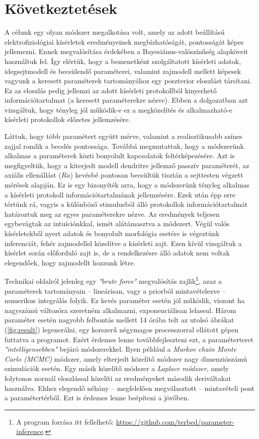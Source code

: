 \section{Következtetések}
A célunk egy olyan módszer megalkotása volt, amely az adott beállítású elektrofiziológiai kísérletek eredményeinek megbízhatóságát, pontosságát képes jellemezni. Ennek megvalósítása érdekében a Bayesiánus-valószínűség alapköveit használtuk fel. Így elértük, hogy a bemenetként szolgáltatott kísérleti adatok, idegsejtmodell és becsülendő paraméterei, valamint zajmodell mellett képesek vagyunk a keresett paraméterek tartományához egy poszterior eloszlást társítani. Ez az eloszlás pedig jellemzi az adott kísérleti protokollból kinyerhető információtartalmat (a keresett paraméterekre nézve). Ebben a dolgozatban azt vizsgáltuk, hogy tényleg jól működik-e ez a megközelítés és alkalmazható-e kísérleti protokollok előzetes jellemzésére.

Láttuk, hogy több paramétert együtt mérve, valamint a realisztikusabb színes zajjal romlik a becslés pontossága. Továbbá megmutattuk, hogy a módszerünk alkalmas a paraméterek közti bonyolult kapcsolatok feltérképezésére. Azt is megfigyeltük, hogy a kiterjedt modell dendritre jellemző passzív paraméterét, az axiális ellenállást ($Ra$) kevésbé pontosan becsültük tisztán a sejttesten végzett mérések alapján. Ez is egy bizonyíték arra, hogy a módszerünk tényleg alkalmas a kísérleti protokoll információtartalmának jellemzésére. Ezek után épp erre tértünk rá, vagyis a különböző stimulusból álló protokollok információtartalmát határoztuk meg az egyes paraméterekre nézve. Az eredmények teljesen egybevágtak az intuíciónkkal, ismét alátámasztva a módszert. Végül valós kísérletekből nyert adatok és bonyolult morfológia esetére is végeztünk inferenciát, fehér zajmodellel közelítve a kísérleti zajt. Ezen kívül vizsgáltuk a kísérlet során előforduló zajt is, de a rendelkezésre álló adatok nem voltak elegendőek, hogy zajmodellt hozzunk létre.

Technikai oldalról jelenleg egy \textit{"brute force"} megvalósítás zajlik\footnote{A program forrása itt fellelhető: \href{https://github.com/terbed/parameter-inference}{https://github.com/terbed/parameter-inference}.}, azaz a paraméterek tartományain -- lineárisan, vagy a priorból mintavételezve -- numerikus integrálás folyik. Ez kevés paraméter esetén jól működik, viszont ha nagyszámú változóra szeretném alkalmazni, exponenciálisan lelassul. Három paraméter esetén nagyobb felbontás mellett 14 órába telt az utolsó ábrákat (\ref{fig:result}) legenerálni, egy korszerű négymagos processzorral ellátott gépen futtatva a programot. Ezért érdemes lenne továbbfejleszteni ezt, a paraméterteret \textit{"intelligensebben"} bejáró módszerekkel. Ilyen például a \textit{Markov chain Monte Carlo (MCMC)} módszer, amely elterjedt közelítő módszer nagy dimenziószámú szimulációk esetén. Egy másik közelítő módszer a \textit{Laplace módszer}\cite{azevedo1994laplace}, amely folytonos normál eloszlással közelíti az eredményeket második deriváltakat használva. Ehhez elegendő néhány -- megfelelően megválasztott -- mintavételi pont a paramétertérből. Ezt is érdemes lenne beépíteni a jövőben.

